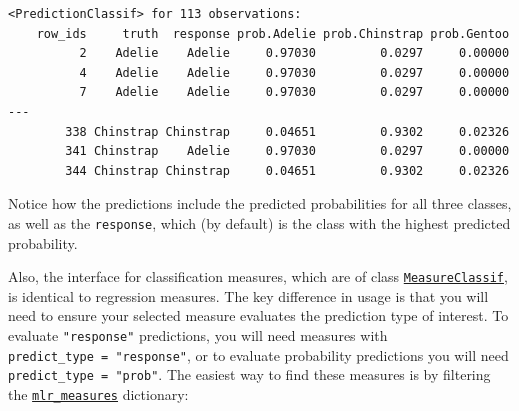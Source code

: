 \begin{Shaded}
\begin{Highlighting}[]
\OtherTok{=} \NormalTok{(}\NormalTok{, } \NormalTok{)}
\SpecialCharTok{$}\SpecialCharTok{$}
\OtherTok{=}\SpecialCharTok{$}\SpecialCharTok{$}
\end{Highlighting}
\end{Shaded}

\begin{verbatim}
<PredictionClassif> for 113 observations:
    row_ids     truth  response prob.Adelie prob.Chinstrap prob.Gentoo
          2    Adelie    Adelie     0.97030         0.0297     0.00000
          4    Adelie    Adelie     0.97030         0.0297     0.00000
          7    Adelie    Adelie     0.97030         0.0297     0.00000
---                                                                   
        338 Chinstrap Chinstrap     0.04651         0.9302     0.02326
        341 Chinstrap    Adelie     0.97030         0.0297     0.00000
        344 Chinstrap Chinstrap     0.04651         0.9302     0.02326
\end{verbatim}

Notice how the predictions include the predicted probabilities for all
three classes, as well as the \texttt{response}, which (by default) is
the class with the highest predicted probability.

Also, the interface for classification measures, which are of class
\href{https://mlr3.mlr-org.com/reference/MeasureClassif.html}{\texttt{MeasureClassif}},
is identical to regression measures. The key difference in usage is that
you will need to ensure your selected measure evaluates the prediction
type of interest. To
evaluate \texttt{"response"} predictions, you will need measures with
\texttt{predict\_type\ =\ "response"}, or to evaluate probability
predictions you will need \texttt{predict\_type\ =\ "prob"}. The easiest
way to find these measures is by filtering the
\href{https://mlr3.mlr-org.com/reference/mlr_measures.html}{\texttt{mlr\_measures}}
dictionary:


